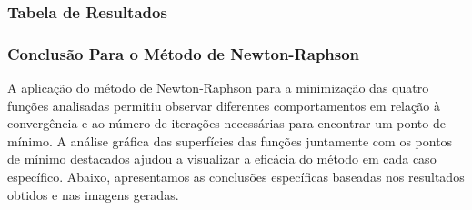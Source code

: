 \documentclass[a4paper, 12pt]{article}
\begin{document}
\subsubsection{Tabela de Resultados}

\begin{table}[H]
    \centering
    \caption{Resultados do Método Newton-Raphson para cada Função}
    \label{tab:newton_raphson_results}
\end{table}


\subsubsection{Conclusão Para o Método de Newton-Raphson}
A aplicação do método de Newton-Raphson para a minimização das quatro funções analisadas permitiu observar diferentes comportamentos em relação à convergência e ao número de iterações necessárias para encontrar um ponto de mínimo. A análise gráfica das superfícies das funções juntamente com os pontos de mínimo destacados ajudou a visualizar a eficácia do método em cada caso específico. Abaixo, apresentamos as conclusões específicas baseadas nos resultados obtidos e nas imagens geradas.
\end{document}
